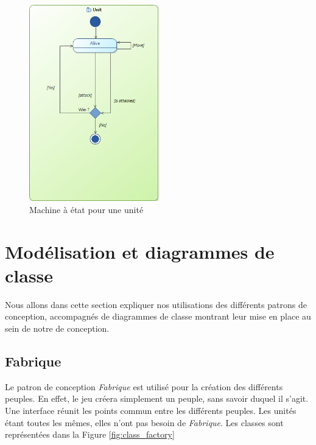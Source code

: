 \documentclass[a4paper]{article}
\begin{document}
\begin{figure}[ht]
\centering
	\includegraphics[width=0.5\textwidth, height=0.4\textheight]{../Schemas/machine_etat_unite.png}
		\caption{Machine à état pour une unité}
		\label{fig:machine_unite}
\end{figure}

\clearpage
\section{Modélisation et diagrammes de classe}
Nous allons dans cette section expliquer nos utilisations des différents patrons de conception, accompagnés de diagrammes de classe montrant leur mise en place au sein de notre de conception.
	
	\subsection{Fabrique}
Le patron de conception \textit{Fabrique} est utilisé pour la création des différents peuples. En effet, le jeu créera simplement un peuple, sans savoir duquel il s'agit. Une interface réunit les points commun entre les différents peuples. Les unités étant toutes les mêmes, elles n'ont pas besoin de \textit{Fabrique}. Les classes sont représentées dans la Figure \ref{fig:class_factory}
\end{document}
